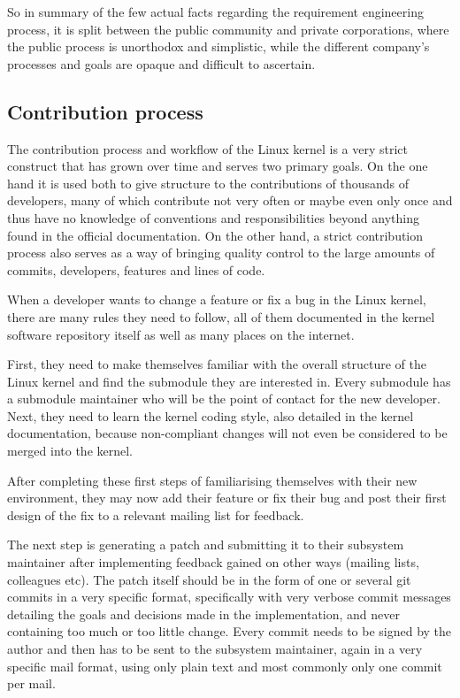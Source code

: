 \documentclass{sig-alternate-05-2015}
\begin{document}
So in summary of the few actual facts regarding the requirement engineering process, it is split between the public community and private corporations, where the public process is unorthodox and simplistic, while the different company's processes and goals are opaque and difficult to ascertain.

\subsection{Contribution process}

The contribution process and workflow of the Linux kernel is a very strict construct that has grown over time and serves two primary goals.
On the one hand it is used both to give structure to the contributions of thousands of developers, many of which contribute not very often or maybe even only once and thus have no knowledge of conventions and responsibilities beyond anything found in the official documentation.
On the other hand, a strict contribution process also serves as a way of bringing quality control to the large amounts of commits, developers, features and lines of code.

When a developer wants to change a feature or fix a bug in the Linux kernel, there are many rules they need to follow, all of them documented in the kernel software repository itself as well as many places on the internet.

First, they need to make themselves familiar with the overall structure of the Linux kernel and find the submodule they are interested in.
Every submodule has a submodule maintainer who will be the point of contact for the new developer.
Next, they need to learn the kernel coding style, also detailed in the kernel documentation, because non-compliant changes will not even be considered to be merged into the kernel.

After completing these first steps of familiarising themselves with their new environment, they may now add their feature or fix their bug and post their first design of the fix to a relevant mailing list for feedback.

The next step is generating a patch and submitting it to their subsystem maintainer after implementing feedback gained on other ways (mailing lists, colleagues etc).
The patch itself should be in the form of one or several git commits in a very specific format, specifically with very verbose commit messages detailing the goals and decisions made in the implementation, and never containing too much or too little change.
Every commit needs to be signed by the author and then has to be sent to the subsystem maintainer, again in a very specific mail format, using only plain text and most commonly only one commit per mail.
\end{document}
